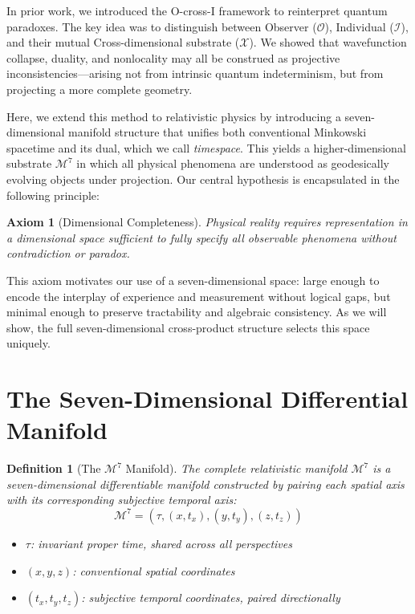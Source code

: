 \documentclass{article}
\newtheorem{definition}{Definition}
\newtheorem{axiom}{Axiom}
\begin{document}
In prior work, we introduced the O-cross-I framework to reinterpret quantum paradoxes. The key idea was to distinguish between Observer (\(\mathcal{O}\)), Individual (\(\mathcal{I}\)), and their mutual Cross-dimensional substrate (\(\mathcal{X}\)). We showed that wavefunction collapse, duality, and nonlocality may all be construed as projective inconsistencies---arising not from intrinsic quantum indeterminism, but from projecting a more complete geometry.

Here, we extend this method to relativistic physics by introducing a seven-dimensional manifold structure that unifies both conventional Minkowski spacetime and its dual, which we call \textit{timespace}. This yields a higher-dimensional substrate \( \mathcal{M}^7 \) in which all physical phenomena are understood as geodesically evolving objects under projection. Our central hypothesis is encapsulated in the following principle:

\begin{axiom}[Dimensional Completeness]
Physical reality requires representation in a dimensional space sufficient to fully specify all observable phenomena without contradiction or paradox.
\end{axiom}

This axiom motivates our use of a seven-dimensional space: large enough to encode the interplay of experience and measurement without logical gaps, but minimal enough to preserve tractability and algebraic consistency. As we will show, the full seven-dimensional cross-product structure selects this space uniquely.

\section{The Seven-Dimensional Differential Manifold}

\begin{definition}[The \(\mathcal{M}^7\) Manifold]
The complete relativistic manifold \(\mathcal{M}^7\) is a seven-dimensional differentiable manifold constructed by pairing each spatial axis with its corresponding subjective temporal axis:
\begin{equation}
\mathcal{M}^7 = (\tau, (x, t_x), (y, t_y), (z, t_z))
\end{equation}
\begin{itemize}
  \item \(\tau\): invariant proper time, shared across all perspectives
  \item \((x, y, z)\): conventional spatial coordinates
  \item \((t_x, t_y, t_z)\): subjective temporal coordinates, paired directionally
\end{itemize}
\end{definition}
\end{document}
